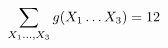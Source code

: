\documentclass[preview]{standalone}
\begin{document}
\begin{align*}
\special{dvisvgm:raw <g id='unique000'>}\sum_{X_1\ldots,X_3} g(X_1\ldots X_3) = 12\special{dvisvgm:raw </g>}
\end{align*}
\end{document}
